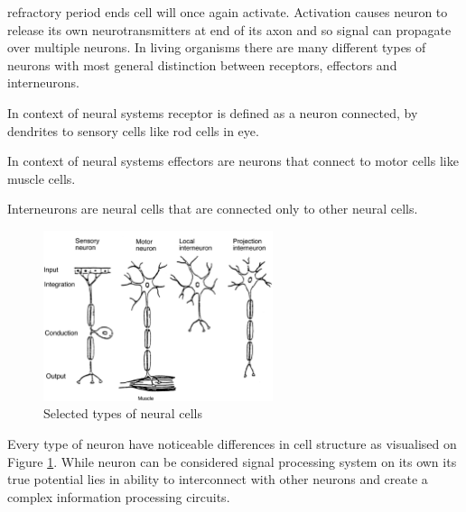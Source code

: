 refractory period ends cell will once again activate.
Activation causes neuron to release its own neurotransmitters at end of its axon and so signal
can propagate over multiple neurons. 
In living organisms there are many different types of neurons with most general distinction
between receptors, effectors and interneurons.
\begin{definition}[Receptor]
	In context of neural systems receptor is defined as a neuron connected, by dendrites to sensory 
	cells like rod cells in eye.
\end{definition}
\begin{definition}[Effector]
	In context of neural systems effectors are neurons that connect to motor cells like muscle 
	cells.
\end{definition}
\begin{definition}[Interneuron]
	Interneurons are neural cells that are connected only to other neural cells.
\end{definition}

\begin{figure}[htb] 
	\centering
	\includegraphics[width=0.6\textwidth]{figures/bio_neurons}
	\caption{Selected types of neural cells}
	\label{fig:bio_neurons}
\end{figure}
Every type of neuron have noticeable differences in cell structure as visualised on 
Figure \ref{fig:bio_neurons}. 
While neuron can be considered signal processing system on its own its true potential lies in 
ability to interconnect with other neurons and create a complex information processing circuits.

\FloatBarrier

